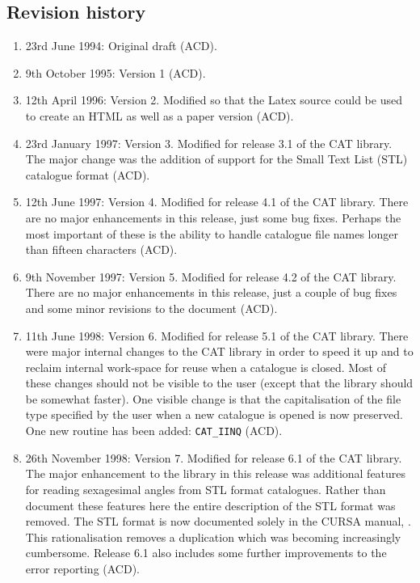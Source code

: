 \documentclass[11pt,twoside]{starlink}
\begin{document}
\newpage
\subsection*{Revision history}

\begin{enumerate}

  \item 23rd June 1994: Original draft (ACD).

  \item 9th October 1995: Version 1 (ACD).

  \item 12th April 1996: Version 2.  Modified so that the Latex source
   could be used to create an HTML as well as a paper version (ACD).

  \item 23rd January 1997: Version 3.  Modified for release 3.1 of the
   CAT library.  The major change was the addition of support for the
   Small Text List (STL) catalogue format (ACD).

  \item 12th June 1997: Version 4.  Modified for release 4.1 of the
   CAT library.  There are no major enhancements in this release, just
   some bug fixes.  Perhaps the most important of these is the ability
   to handle catalogue file names longer than fifteen characters (ACD).

  \item 9th November 1997: Version 5.  Modified for release 4.2 of the
   CAT library.  There are no major enhancements in this release, just
   a couple of bug fixes and some minor revisions to the document (ACD).

  \item 11th June 1998: Version 6.  Modified for release 5.1 of the
   CAT library.  There were major internal changes to the CAT library
   in order to speed it up and to reclaim internal work-space for
   reuse when a catalogue is closed.  Most of these changes should
   not be visible to the user (except that the library should be
   somewhat faster).  One visible change is that the capitalisation
   of the file type specified by the user when a new catalogue is
   opened is now preserved.  One new routine has been added: \texttt{CAT\_IINQ} (ACD).

  \item 26th November 1998: Version 7.  Modified for release 6.1 of the
   CAT library.  The major enhancement to the library in this release
   was additional features for reading sexagesimal angles from STL
   format catalogues.  Rather than document these features here the
   entire description of the STL format was removed.  The STL format
   is now documented solely in the CURSA manual, .
   This rationalisation removes a duplication which was becoming
   increasingly cumbersome.  Release 6.1 also includes some further
   improvements to the error reporting (ACD).


\end{enumerate}
\end{document}
